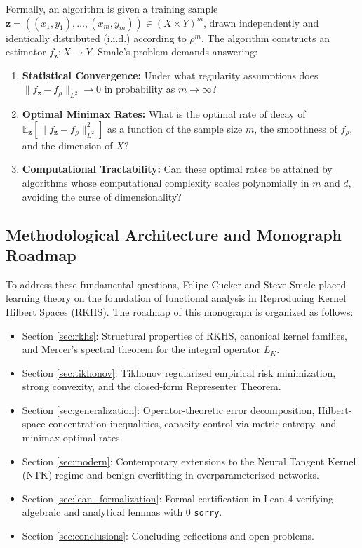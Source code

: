 \documentclass[11pt,a4paper]{article}
\theoremstyle{definition}
\begin{document}
Formally, an algorithm is given a training sample $\mathbf{z} = ((x_1, y_1), \dots, (x_m, y_m)) \in (X \times Y)^m$, drawn independently and identically distributed (i.i.d.) according to $\rho^m$. The algorithm constructs an estimator $f_{\mathbf{z}}: X \to Y$. Smale's problem demands answering:
\begin{enumerate}
    \item \textbf{Statistical Convergence:} Under what regularity assumptions does $\|f_{\mathbf{z}} - f_\rho\|_{L^2} \to 0$ in probability as $m \to \infty$?
    \item \textbf{Optimal Minimax Rates:} What is the optimal rate of decay of $\mathbb{E}_{\mathbf{z}} [\|f_{\mathbf{z}} - f_\rho\|_{L^2}^2]$ as a function of the sample size $m$, the smoothness of $f_\rho$, and the dimension of $X$?
    \item \textbf{Computational Tractability:} Can these optimal rates be attained by algorithms whose computational complexity scales polynomially in $m$ and $d$, avoiding the curse of dimensionality?
\end{enumerate}

\subsection{Methodological Architecture and Monograph Roadmap}
To address these fundamental questions, Felipe Cucker and Steve Smale \cite{cucker2002} placed learning theory on the foundation of functional analysis in Reproducing Kernel Hilbert Spaces (RKHS).
The roadmap of this monograph is organized as follows:
\begin{itemize}
    \item Section \ref{sec:rkhs}: Structural properties of RKHS, canonical kernel families, and Mercer's spectral theorem for the integral operator $L_K$.
    \item Section \ref{sec:tikhonov}: Tikhonov regularized empirical risk minimization, strong convexity, and the closed-form Representer Theorem.
    \item Section \ref{sec:generalization}: Operator-theoretic error decomposition, Hilbert-space concentration inequalities, capacity control via metric entropy, and minimax optimal rates.
    \item Section \ref{sec:modern}: Contemporary extensions to the Neural Tangent Kernel (NTK) regime and benign overfitting in overparameterized networks.
    \item Section \ref{sec:lean_formalization}: Formal certification in Lean 4 verifying algebraic and analytical lemmas with 0 \texttt{sorry}.
    \item Section \ref{sec:conclusions}: Concluding reflections and open problems.
\end{itemize}
\end{document}
